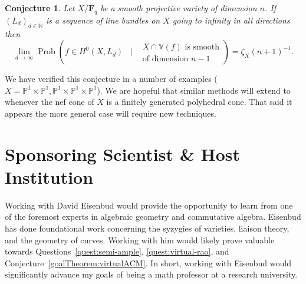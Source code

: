 \documentclass[11pt,reqno]{amsart}
\newtheorem{conj}[lemma]{Conjecture}
\theoremstyle{remark}
\newcommand{\Prob}{\operatorname{Prob}}
\newcommand{\Nef}{\operatorname{Nef}}
\newcommand{\fF}{\mathbf F}
\newcommand{\cD}{\mathcal{D}}
\newcommand{\cL}{\mathcal{L}}
\newcommand{\N}{\mathbb{N}}
\renewcommand{\P}{\mathbb{P}}
\newcommand{\V}{\mathbb{V}}
\begin{document}
\begin{conj}\label{gthm:effective-bertini}
Let $X/\fF_{q}$ be a smooth projective variety of dimension $n$. If $\left(L_{d}\right)_{d\in\N}$ is a sequence of line bundles on $X$ going to infinity in all directions then 
\begin{equation}
\lim_{d\to \infty} \Prob\left(f \in H^0\left(X, L_{d}\right)  \;\;\; \bigg| \;\;\; 
\begin{matrix}
 \text{$X\cap\V(f)$ is smooth}\\
 \text{of dimension $n-1$}
 \end{matrix}
\right)=
\zeta_X(n+1)^{-1}.
\end{equation}
\end{conj}

We have verified this conjecture in a number of examples ($X=\P^1\times\P^1, \P^1\times\P^1\times\P^1$). We  are hopeful that similar methods will extend to whenever the nef cone of $X$ is a finitely generated polyhedral cone. That said it appears the more general case  will require new techniques. 

%
%
%
 
 \section{Sponsoring Scientist \& Host Institution}
 
Working with David Eisenbud would provide the opportunity to learn from one of the foremost experts in algebraic geometry and commutative algebra. Eisenbud has done foundational work concerning the syzygies of varieties, liaison theory, and the geometry of curves. Working with him would likely prove valuable towards Questions~\ref{quest:semi-ample}, \ref{quest:virtual-rao}, and Conjecture~\ref{goalTheorem:virtualACM}. In short, working with Eisenbud would significantly advance my goals of being a math professor at a research university.
\end{document}

